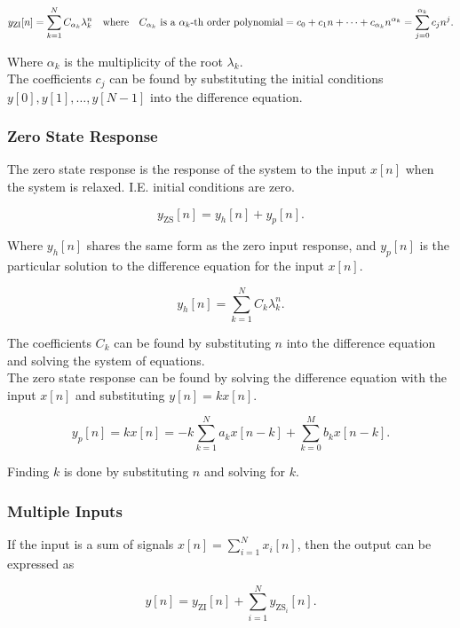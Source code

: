 \documentclass{report}
\begin{document}
\[
	y_\text{ZI}[n] = \sum_{k=1}^{N} C_{\alpha_k} \lambda_k^n \qq{where} C_{\alpha_k} \text{ is a $\alpha_k$-th order polynomial} = c_0 + c_1n + \cdots + c_{\alpha_k} n^{\alpha_k} = \sum_{j=0}^{\alpha_k} c_jn^j
	.\]

Where $\alpha_k$ is the multiplicity of the root $\lambda_k$.\\

The coefficients $c_j$ can be found by substituting the initial conditions $y[0], y[1], \ldots, y[N-1]$ into the difference equation.

\subsubsection{Zero State Response}

The zero state response is the response of the system to the input $x[n]$ when the system is relaxed. I.E. initial conditions are zero.

\[
	y_\text{ZS}[n] = y_h[n] + y_p[n]
	.\]

Where $y_h[n]$ shares the same form as the zero input response, and $y_p[n]$ is the particular solution to the difference equation for the input $x[n]$.

\[
	y_h[n] = \sum_{k=1}^{N} C_k \lambda_k^n
	.\]

The coefficients $C_k$ can be found by substituting $n$ into the difference equation and solving the system of equations.\\

The zero state response can be found by solving the difference equation with the input $x[n]$ and substituting $y[n] = kx[n]$.

\[
	y_p[n] = kx[n] = -k \sum_{k=1}^{N} a_k x[n-k] + \sum_{k=0}^{M} b_k x[n-k]
	.\]

Finding $k$ is done by substituting $n$ and solving for $k$.


\subsubsection{Multiple Inputs}

If the input is a sum of signals $x[n] = \sum_{i=1}^{N} x_i[n]$, then the output can be expressed as

\[
	y[n] = y_\text{ZI}[n] + \sum_{i=1}^{N} y_{\text{ZS}_i}[n]
	.\]
\end{document}
